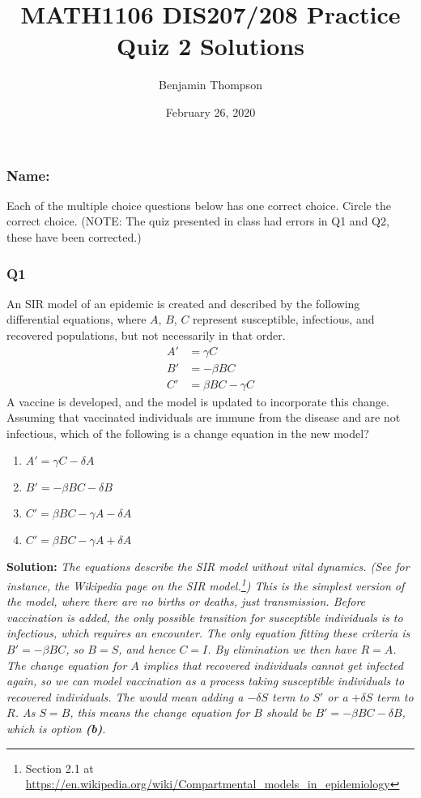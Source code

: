 \documentclass[a4paper,12pt]{article}
\title{MATH1106 DIS207/208 Practice Quiz 2 Solutions}
\author{Benjamin Thompson}
\date{February 26, 2020}
\begin{document}
\subsubsection*{Name:}
Each of the multiple choice questions below has one correct choice. Circle the correct choice. (NOTE: The quiz presented in class had errors in Q1 and Q2, these have been corrected.)
\subsubsection*{Q1}
An SIR model of an epidemic is created and described by the following differential equations, where $A$, $B$, $C$ represent susceptible, infectious, and recovered populations, but not necessarily in that order.
\begin{align*}
A' &= \gamma C \\
B' &= -\beta BC  \\
C' &= \beta BC - \gamma C
\end{align*}
A vaccine is developed, and the model is updated to incorporate this change. Assuming that vaccinated individuals are immune from the disease and are not infectious, which of the following is a change equation in the new model?

\begin{enumerate}[label=(\alph*)]
\item $A' = \gamma C - \delta A$
\item $B' = -\beta BC - \delta B$
\item $C' = \beta BC - \gamma A - \delta A$
\item $C' = \beta BC - \gamma A + \delta A$
\end{enumerate}

\textbf{Solution:} \emph{The equations describe the SIR model without vital dynamics. (See for instance, the Wikipedia page on the SIR model.\footnote{Section 2.1 at \url{https://en.wikipedia.org/wiki/Compartmental_models_in_epidemiology}}) This is the simplest version of the model, where there are no births or deaths, just transmission. Before vaccination is added, the only possible transition for susceptible individuals is to infectious, which requires an encounter. The only equation fitting these criteria is $B' = -\beta BC$, so $B = S$, and hence $C = I$. By elimination we then have $R = A$. The change equation for $A$ implies that recovered individuals cannot get infected again, so we can model vaccination as a process taking susceptible individuals to recovered individuals. The would mean adding a $-\delta S$ term to $S'$ or a $+\delta S$ term to $R$. As $S = B$, this means the change equation for $B$ should be $B' = -\beta BC - \delta B$, which is option \textbf{(b)}}.
\end{document}
